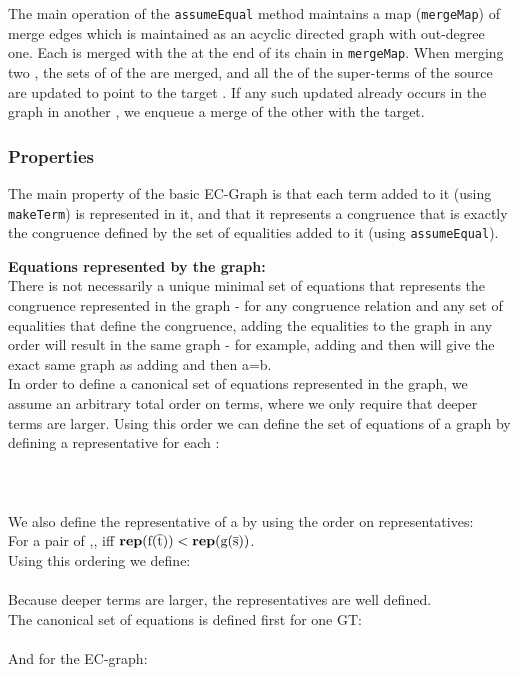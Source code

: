 \noindent
The main operation of the \lstinline|assumeEqual| method maintains a map (\lstinline|mergeMap|) of merge edges which is maintained as an acyclic directed graph with out-degree one. 
Each \GT{} is merged with the \GT{} at the end of its chain in \lstinline|mergeMap|.
When merging two \GTs{}, the sets of \GFAs{} of the \GTs{} are merged, and all the \GFAs{} of the super-terms of the source \GT{} are updated to point to the target \GT{}. If any such updated \GFA{} already occurs in the graph in another \GT{}, we enqueue a merge of the other \GT{} with the target.

\subsubsection*{Properties}
The main property of the basic EC-Graph is that each term added to it (using \lstinline|makeTerm|) is represented in it, and that it represents a congruence that is exactly the congruence defined by the set of equalities added to it (using \lstinline|assumeEqual|).

\noindent
\textbf{Equations represented by the graph:}\\
There is not necessarily a unique minimal set of equations that represents the congruence represented in the graph - for any congruence relation and any set of equalities that define the congruence, adding the equalities to the graph in any order will result in the same graph - for example, adding  and then  will give the exact same graph as adding  and then {a=b}.\\
In order to define a canonical set of equations represented in the graph, we assume an arbitrary total order on terms, where we only require that deeper terms are larger. Using this order we can define the set of equations of a graph by defining a representative for each \GT{}:\\
\\
\\
\\
We also define the representative \GFA{} of a \GT{} by using the order on \GFA{} representatives:\\
For a pair of  \GFAs{} ,,  iff $\mathrm{\textbf{rep}(\mathrm{f}(\mathrm{\overline{t}}))}<\mathrm{\textbf{rep}(\mathrm{g}(\mathrm{\overline{s}}))}$.\\
Using this ordering we define:\\
\\
Because deeper terms are larger, the representatives are well defined.\\
The canonical set of equations is defined first for one GT{}:\\
\\
And for the EC-graph:\\


